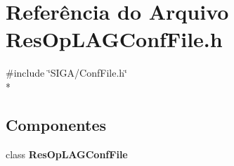 \section{Referência do Arquivo Res\+Op\+L\+A\+G\+Conf\+File.\+h}
\label{_res_op_l_a_g_conf_file_8h}
{\ttfamily \#include \char`\"{}S\+I\+G\+A/\+Conf\+File.\+h\char`\"{}}\\*
\subsection*{Componentes}
\begin{DoxyCompactItemize}
\item 
class {\bf Res\+Op\+L\+A\+G\+Conf\+File}
\end{DoxyCompactItemize}
